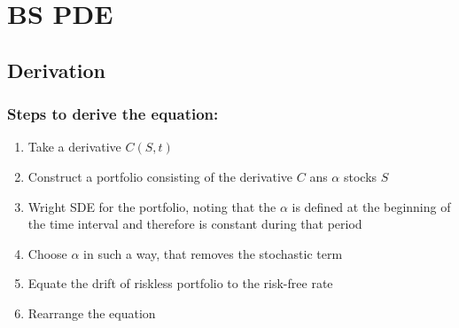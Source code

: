 \chapter{BS PDE}
\section{Derivation}
\subsection{Steps to derive the equation:}
\begin{enumerate}
	\item Take a derivative $C(S, t)$
	\item Construct a portfolio consisting of the derivative $C$ ans $\alpha$ stocks $S$
	\item Wright SDE for the portfolio, noting that the $\alpha$ is defined at the beginning of the time interval and therefore is constant during that period
	\item Choose $\alpha$ in such a way, that removes the stochastic term
	\item Equate the drift of riskless portfolio to the risk-free rate
	\item Rearrange the equation
\end{enumerate}

